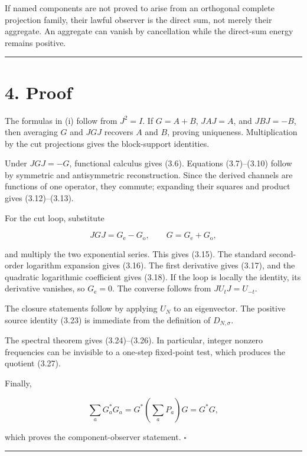 If named components are not proved to arise from an orthogonal complete
projection family, their lawful observer is the direct sum, not merely their
aggregate. An aggregate can vanish by cancellation while the direct-sum energy
remains positive.

\begin{center}\rule{0.5\linewidth}{0.5pt}\end{center}

\hypertarget{proof}{%
\section{4. Proof}\label{proof}}

The formulas in (i) follow from \(J^2=I\). If
\(G=A+B\), \(JAJ=A\), and \(JBJ=-B\), then averaging \(G\) and \(JGJ\)
recovers \(A\) and \(B\), proving uniqueness. Multiplication by the cut
projections gives the block-support identities.

Under \(JGJ=-G\), functional calculus gives (3.6). Equations (3.7)--(3.10)
follow by symmetric and antisymmetric reconstruction. Since the derived
channels are functions of one operator, they commute; expanding their squares
and product gives (3.12)--(3.13).

For the cut loop, substitute

\[
JGJ=G_{\mathrm e}-G_{\mathrm o},
\qquad
G=G_{\mathrm e}+G_{\mathrm o},
\]

and multiply the two exponential series. This gives (3.15). The standard
second-order logarithm expansion gives (3.16). The first derivative gives
(3.17), and the quadratic logarithmic coefficient gives (3.18). If the loop is
locally the identity, its derivative vanishes, so \(G_{\mathrm e}=0\). The
converse follows from \(JU_tJ=U_{-t}\).

The closure statements follow by applying \(U_N\) to an eigenvector. The
positive source identity (3.23) is immediate from the definition of
\(D_{N,\sigma}\).

The spectral theorem gives (3.24)--(3.26). In particular, integer nonzero
frequencies can be invisible to a one-step fixed-point test, which produces the
quotient (3.27).

Finally,

\[
\sum_aG_a^*G_a
=
G^*\left(\sum_aP_a\right)G
=
G^*G,
\]

which proves the component-observer statement. \(\square\)

\begin{center}\rule{0.5\linewidth}{0.5pt}\end{center}

